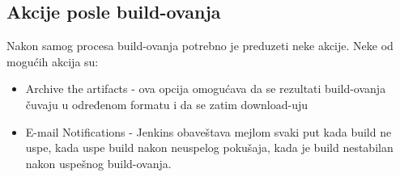 \subsection{Akcije posle build-ovanja}

Nakon samog procesa build-ovanja potrebno je preduzeti neke akcije. Neke od mogućih akcija su:
\begin{itemize}
\item Archive the artifacts - ova opcija omogućava da se rezultati build-ovanja čuvaju u određenom formatu i da se zatim download-uju
\item E-mail Notifications - Jenkins obaveštava mejlom svaki put kada build ne uspe, kada uspe build nakon neuspelog pokušaja, kada je build nestabilan nakon uspešnog build-ovanja.
\end{itemize}